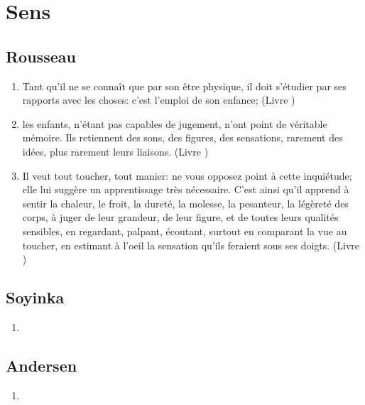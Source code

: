 \documentclass[a4paper, 11pt, hidelinks]{article}
\newcommand{\rb}[1]{\Romanbar{#1}}
\begin{document}
\section{Sens}



\subsection{Rousseau}


\begin{enumerate}
    \item Tant qu'il ne se connaît que par son être physique, il doit s'étudier par ses rapports avec les choses: c'est l'emploi de son enfance; (Livre \rb{2})
    \item les enfants, n'étant pas capables de jugement, n'ont point de véritable mémoire. Ils retiennent des sons, des figures, des sensations, rarement des idées, plus rarement leurs liaisons. (Livre \rb{2})
    \item Il veut tout toucher, tout manier: ne vous opposez point à cette inquiétude; elle lui suggère un apprentissage très nécessaire. C'est ainsi qu'il apprend à sentir la chaleur, le froit, la dureté, la molesse, la pesanteur, la légèreté des corps, à juger de leur grandeur, de leur figure, et de toutes leurs qualités sensibles, en regardant, palpant, écoutant, surtout en comparant la vue au toucher, en estimant à l'oeil la sensation qu'ils feraient sous ses doigts. (Livre \rb{1})
\end{enumerate}



\subsection{Soyinka}


\begin{enumerate}
    \item 
\end{enumerate}




\subsection{Andersen}


\begin{enumerate}
    \item 
\end{enumerate}
\end{document}
